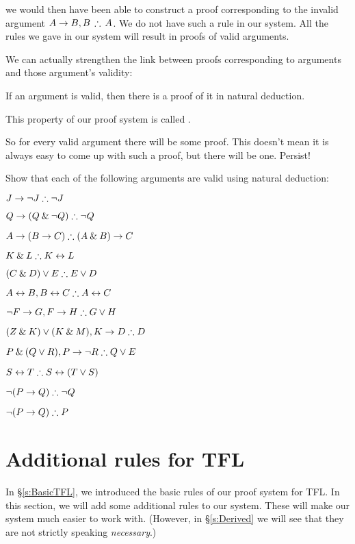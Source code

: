 	we would then have been able to construct a proof corresponding to the invalid argument $A\eif B, B\,\therefore\, A$. 
We do not have such a rule in our system. All the rules we gave in our system will result in proofs of valid arguments.


We can actually strengthen the link between proofs corresponding to arguments and those argument's validity:
\begin{highlighted}
If an argument is valid, then there is a proof of it in natural deduction.
\end{highlighted}
This property of our proof system is called . 

So for every valid argument there will be some proof. This doesn't mean it is always easy to come up with such a proof, but there will be one. Persist!






\practiceproblems

\problempart
\label{pr.solvedTFLproofs}
Show that each of the following arguments are valid using natural deduction:
\begin{earg}
\item $J\eif\enot J \therefore \enot J$
\item $Q\eif(Q\eand\enot Q) \therefore \enot Q$
\item $A\eif (B\eif C) \therefore (A\eand B)\eif C$
\item $K\eand L \therefore K\eiff L$
\item $(C\eand D)\eor E \therefore E\eor D$
\item $A\eiff B, B\eiff C \therefore A\eiff C$
\item $\enot F\eif G, F\eif H \therefore G\eor H$
\item $(Z\eand K) \eor (K\eand M), K \eif D \therefore D$
\item $P \eand (Q\eor R), P\eif \enot R \therefore Q\eor E$
\item $S\eiff T \therefore S\eiff (T\eor S)$
\item $\enot (P \eif Q) \therefore \enot Q$
\item $\enot (P \eif Q) \therefore P$
\end{earg}






\chapter{Additional rules for TFL}\label{s:Further}
In \S\ref{s:BasicTFL}, we introduced the basic rules of our proof system for TFL. In this section, we will add some additional rules to our system. These will make our system much easier to work with. (However, in \S\ref{s:Derived} we will see that they are not strictly speaking \emph{necessary}.)

